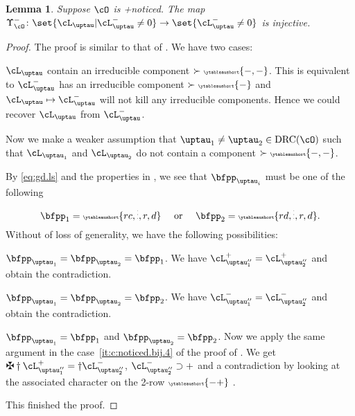 \documentclass[12pt,a4paper]{amsart}
\numberwithin{equation}{section}
\newtheorem{lem}[thm]{Lemma}
\theoremstyle{remark}
\def\ssign{\mathrm{Sign}}
\def\drc{\mathrm{DRC}}
\let\ytb=\ytableaushort
\newcommand{\tytb}[1]{{\tiny\ytb{#1}}}
\def\nUpsilon{\Upsilon^-}
\def\pcL{\cL^+}
\def\ncL{\cL^-}
\def\uptaupp{\uptau^{\prime\prime}}
\begin{document}
\begin{lem}\label{c:gd.pnoticed.n}
    Suppose $\cO$ is +noticed.
    The map $\nUpsilon_{\cO}\colon \set{\cL_{\uptau}|\ncL_{\uptau}\neq 0}\rightarrow \set{\ncL_{\uptau}\neq 0}$
    is injective.
\end{lem}
\begin{proof}
  The proof is similar to that of .
    We have two cases:
    \begin{enumPF}
      \item $\cL_{\uptau}$ contain an irreducible component $\succ \tytb{-,-}$.
      This is equivalent to $\ncL_{\uptau}$ has an irreducible component
      $\succ\tytb{-}$ and $\cL_{\uptau}\mapsto \ncL_{\uptau}$ will
      not kill any irreducible components. Hence we could recover $\cL_{\uptau}$
      from $\ncL_{\uptau}$.%

      \item Now we make a weaker assumption that $\uptau_{1}\neq \uptau_{2}\in \drc(\cO)$ such that
      $\cL_{\uptau_{1}}$ and $\cL_{\uptau_{2}}$ do not contain a component
      $\succ \tytb{-,-}$.

      By \eqref{eq:gd.ls} and the properties in , we
      see that $\bfpp_{\uptau_{i}}$ must be one of the following
      \[
        \bfpp_{1}=  \tytb{rc,\vdots,r,d} \quad \text{ or } \quad \bfpp_{2}= \tytb{rd,\vdots,r,d}.
      \]
      Without of loss of generality, we have the following possibilities:
      \begin{enumPF}
        \item $\bfpp_{\uptau_{1}}=\bfpp_{\uptau_{2}}=\bfpp_{1}$. We have
        $\pcL_{\uptaupp_{1}}=\pcL_{\uptaupp_{2}}$ and obtain the contradiction.
        \item $\bfpp_{\uptau_{1}}=\bfpp_{\uptau_{2}}=\bfpp_{2}$. We have
        $\ncL_{\uptaupp_{1}}=\ncL_{\uptaupp_{2}}$ and obtain the contradiction.
        \item $\bfpp_{\uptau_{1}}=\bfpp_{1}$ and $\bfpp_{\uptau_{2}}=\bfpp_{2}$.
        Now we apply the same argument in the case~\ref{it:c:noticed.bij.4} of
        the proof of . We get
        $\maltese \dagger\pcL_{\uptaupp_{1}}=\dagger \ncL_{\uptaupp_{2}}$,
        $\ncL_{\uptaupp_{2}} \supset +$ and a contradiction by looking at the
        associated character on the 2-row $\tytb{-+}$ .
      \end{enumPF}
    \end{enumPF}
    This finished the proof.
\end{proof}
\end{document}
